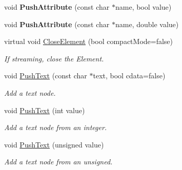 \begin{DoxyCompactItemize}
void {\bfseries Push\+Attribute} (const char $\ast$name, bool value)
\item 
\mbox{\label{classCPlantBox_1_1tinyxml2_1_1XMLPrinter_a57191843366f61d1ac99686395b35fb2}} 
void {\bfseries Push\+Attribute} (const char $\ast$name, double value)
\item 
\mbox{\label{classCPlantBox_1_1tinyxml2_1_1XMLPrinter_ac3c57a5a4b0b87a649a75206361b3e57}} 
virtual void \hyperlink{classCPlantBox_1_1tinyxml2_1_1XMLPrinter_ac3c57a5a4b0b87a649a75206361b3e57}{Close\+Element} (bool compact\+Mode=false)
\begin{DoxyCompactList}\small\item\em If streaming, close the Element. \end{DoxyCompactList}\item 
\mbox{\label{classCPlantBox_1_1tinyxml2_1_1XMLPrinter_a2acf8cb1c9325cdfff241d908f52ed3b}} 
void \hyperlink{classCPlantBox_1_1tinyxml2_1_1XMLPrinter_a2acf8cb1c9325cdfff241d908f52ed3b}{Push\+Text} (const char $\ast$text, bool cdata=false)
\begin{DoxyCompactList}\small\item\em Add a text node. \end{DoxyCompactList}\item 
\mbox{\label{classCPlantBox_1_1tinyxml2_1_1XMLPrinter_a1825eaa181a1a161dc8f1ebc14791d07}} 
void \hyperlink{classCPlantBox_1_1tinyxml2_1_1XMLPrinter_a1825eaa181a1a161dc8f1ebc14791d07}{Push\+Text} (int value)
\begin{DoxyCompactList}\small\item\em Add a text node from an integer. \end{DoxyCompactList}\item 
\mbox{\label{classCPlantBox_1_1tinyxml2_1_1XMLPrinter_a90f82fb41972c820f672131dc3b94e73}} 
void \hyperlink{classCPlantBox_1_1tinyxml2_1_1XMLPrinter_a90f82fb41972c820f672131dc3b94e73}{Push\+Text} (unsigned value)
\begin{DoxyCompactList}\small\item\em Add a text node from an unsigned. \end{DoxyCompactList}\item 

\end{DoxyCompactItemize}
